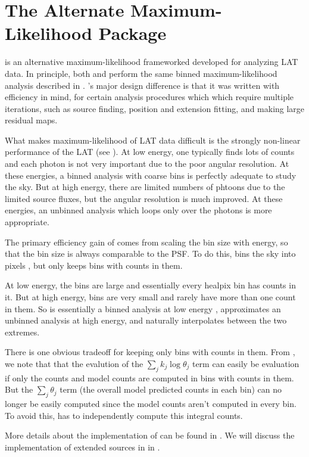 \section{The Alternate Maximum-Likelihood Package \pointlike}

\pointlike is an alternative maximum-likelihood frameworked developed
for analyzing \ac{LAT} data. In principle, both \pointlike and \gtlike
perform the same binned maximum-likelihood analysis described in
. \pointlike's major design difference
is that it was written with efficiency in mind, for certain analysis
procedures which which require multiple iterations, such as source
finding, position and extension fitting, and making large residual
\ts maps.

What makes maximum-likelihood of \ac{LAT} data difficult
is the strongly non-linear performance of the \ac{LAT} (see
). At low energy, one typically finds lots
of counts and each photon is not very important due to the poor angular
resolution. At these energies, a binned analysis with coarse bins is
perfectly adequate to study the sky.  But at high energy, there are
limited numbers of phtoons due to the limited source fluxes, but the
angular resolution is much improved.  At these energies, an unbinned
analysis which loops only over the photons is more appropriate.

The primary efficiency gain of \pointlike comes from scaling the bin
size with energy, so that the bin size is always comparable to the
\ac{PSF}.  To do this, \pointlike bins the sky into \healpix pixels
\citep{gorski_2005_healpix:-framework}, but only keeps bins with counts
in them.

At low energy, the bins are large and essentially every healpix bin
has counts in it.  But at high energy, bins are very small and rarely
have more than one count in them.  So \pointlike is essentially a binned
analysis at low energy , approximates an unbinned analysis at high energy,
and naturally interpolates between the two extremes.

There is one obvious tradeoff for keeping only bins with counts in them.
From , we note that that the evalution
of the $\sum_j k_j\log\theta_j$ term can easily be evaluation if only
the counts and model counts are computed in bins with counts in them.
But the $\sum_j \theta_j$ term (the overall model predicted counts in
each bin) can no longer be easily computed since the model counts aren't
computed in every bin. To avoid this, \pointlike has to independently
compute this integral counts.

More details about the implementation of \pointlike can be found in
\cite{kerr_2010a_likelihood-methods}. We will discuss the implementation
of extended sources in \pointlike in .

